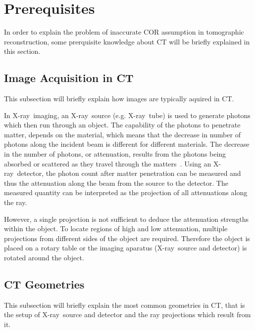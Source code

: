 \documentclass[10pt,journal,compsoc]{IEEEtran}
\newcommand{\xray}{X-ray~}
\begin{document}


\section{Prerequisites}
In order to explain the problem of inaccurate COR assumption in tomographic reconstruction, some prerquisite knowledge about CT will be briefly explained in this section.

\subsection{Image Acquisition in CT}
This subsection will briefly explain how images are typically aquired in CT.

In \xray imaging, an \xray source (e.g. \xray tube) is used to generate photons which then run through an object.
The capability of the photons to penetrate matter, depends on the material, which means that the decrease in number of photons along the incident beam is different for different materials.
The decrease in the number of photons, or attenuation, results from the photons being absorbed or scattered as they travel through the matters~\cite{Buzug2008_chap1}.
Using an \xray detector, the photon count after matter penetration can be measured and thus the attenuation along the beam from the source to the detector.
The measured quantity can be interpreted as the projection of all attenuations along the ray.

However, a single projection is not sufficient to deduce the attenuation strengths within the object. 
To locate regions of high and low attenuation, multiple projections from different sides of the object are required.
Therefore the object is placed on a rotary table or the imaging aparatus (\xray source and detector) is rotated around the object.


\subsection{CT Geometries}
This subsection will briefly explain the most common geometries in CT, that is the setup of \xray source and detector and the ray projections which result from it.
\end{document}
